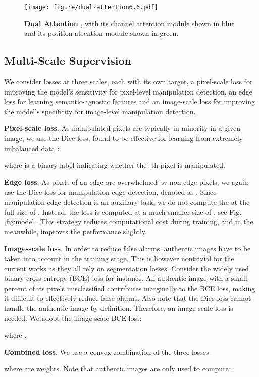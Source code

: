 \begin{figure}[htpb]
    \begin{center}
    \texttt{[image: figure/dual-attention6.6.pdf]}
    \end{center}
    \caption{\textbf{Dual Attention }, with its channel attention module shown in blue and its position attention module shown in green.}
    \label{fig:da}
\end{figure}







\subsection{Multi-Scale Supervision} \label{ssec:loss} 

We consider losses at three scales, each with its own target, \ie a pixel-scale loss for improving the model's sensitivity for pixel-level manipulation detection, an edge loss for learning semantic-agnostic features and an image-scale loss for improving the model's specificity for image-level manipulation detection. 

\textbf{Pixel-scale loss}. As manipulated pixels are typically in minority in a given image, we use the Dice loss, found to be effective for learning from extremely imbalanced data \cite{lesion}:

where  is a binary label indicating whether the -th pixel is manipulated. 







\textbf{Edge loss}. As pixels of an edge are overwhelmed by non-edge pixels, we again use the Dice loss for manipulation edge detection, denoted as . Since manipulation edge detection is an auxiliary task, we do not compute the  at the full size of . Instead, the loss is computed at a much smaller size of , see Fig. \ref{fig:model}. This strategy reduces computational cost during training, and in the meanwhile, improves the performance slightly. 


\textbf{Image-scale loss}. In order to reduce false alarms, authentic images have to be taken into account in the training stage. This is however nontrivial for the current works \cite{mantranet,HPFCN,2020GSR,2017MFCN} as they all rely on segmentation losses. Consider the widely used binary cross-entropy (BCE) loss for instance. An authentic image with a small percent of its pixels misclassified contributes marginally to the BCE loss, making it difficult to effectively reduce false alarms. Also note that the Dice loss cannot handle the authentic image by definition. Therefore, an image-scale loss is needed. 
We adopt the image-scale BCE loss:

where .

\textbf{Combined loss}. We use a convex combination of the three losses:
 
where  are weights. Note that authentic images are only used to compute .
